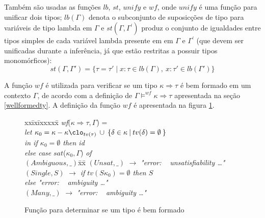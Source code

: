 Tamb\'em s\~ao usadas as fun\c{c}\~oes $lb$, $st$, $unify$ e $wf$, onde $unify$ \'e uma fun\c{c}\~ao para unificar dois
tipos; $lb(\Gamma)$ denota o subconjunto de suposic\c{c}\~oes de tipo para vari\'aveis de tipo lambda em $\Gamma$ e
$st(\Gamma,\Gamma^{\prime})$ produz o conjunto de igualdades entre tipos simples de cada vari\'avel lambda presente em
em $\Gamma$ e $\Gamma^{\prime}$ (que devem ser unificadas durante a infer\^encia, j\'a que est\~ao restritas a possuir
tipos monom\'orficos):
 \[ st(\Gamma,\Gamma') = \{ \tau = \tau' \mid 
        x:\tau \in lb(\Gamma),\: x:\tau' \in lb(\Gamma') \} \]

A fun\c{c}\~ao $wf$ \'e utilizada para verificar se um tipo $\kappa\Rightarrow\tau$ \'e bem formado em um contexto
$\Gamma$, de acordo com a defini\c{c}\~ao de $\Gamma\models^{wf}\kappa\Rightarrow\tau$ apresentada na se\c{c}\~ao 
\ref{wellformedty}. A defini\c{c}\~ao da fun\c{c}\~ao $wf$ \'e apresentada na figura \ref{figwffun}.

\begin{figure}[h]
\begin{center}
\parbox{\textwidth}{
   {\begin{tabbing}
      xx\= ix\= ixxxxx\= \kill
      {\textit{wf}}($\kappa\Rightarrow\tau,\Gamma$) = \+ \\
        \textit{let } $\kappa_0 = \kappa - \kappa\clo_{tv(\tau)}\: \cup \: \{ \delta \in \kappa\:|\: tv(\delta)=\emptyset\: \}$ \\
		\textit{in  if $\kappa_0=\emptyset$ then id} \+ \\
        \textit{ else case} $sat$($\kappa_0,\Gamma$) \textit{of} \+\\
                   $(Ambiguous,\_)$\=xx\= \kill
                   $(Unsat,\_)$       \>$\rightarrow$ \textit{"error: $\,\,\,\,\,$unsatisfiability \ldots"}\\ 
                   $(Single,S)$   \>$\rightarrow$ \textit{if $tv(S\kappa_0)=\emptyset$ then $S$}\\ 
				                       \>\> \textit{ else "error: $\,\,\,\,\,$ambiguity \ldots"} \\ 
                    $(Many, \_)$   \>$\rightarrow$ \textit{"error:  $\,\,\,\,\,$ambiguity \ldots"}\-\-\\
   \end{tabbing} }
}
\end{center}
\caption{Fun\c{c}\~ao para determinar se um tipo \'e bem formado}
\label{figwffun}
\end{figure}

